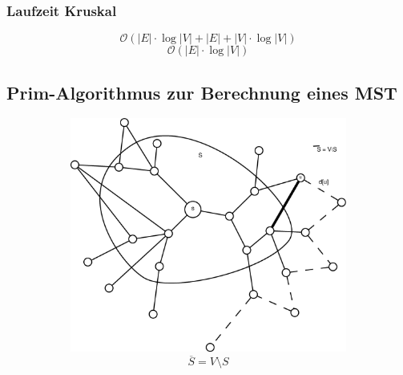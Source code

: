 \subsubsection{Laufzeit Kruskal}
\[ \mathcal{O}(|E|\cdot\log|V|+|E|+|V|\cdot\log|V|) \]
\[ \mathcal{O}(|E|\cdot\log|V|) \]
\pagebreak
\subsection{Prim-Algorithmus zur Berechnung eines MST}

\begin{figure}[H]
\centering
\begin{subfigure}[h]{0.4\textwidth}
	\includegraphics[width=\linewidth]{20/Grafik/img2}
	\[ \overline{S} = V \setminus S \]
\end{subfigure}
\begin{subfigure}[h]{0.4\textwidth}

\end{subfigure}
\end{figure}
